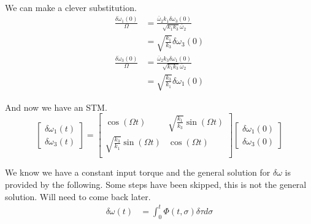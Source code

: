 \documentclass[]{article}
\begin{document}
We can make a clever substitution.
\begin{align}
	\frac{\delta \dot{\omega}_1 (0)}{\Omega} & = \frac{\bar{\omega}_2 k_1 \delta \omega_3(0)}{\sqrt{k_1 k_3} \bar{\omega}_2} \\
	& = \sqrt{\frac{k_1}{k_3}}\delta \omega_3(0) \\
	\frac{\delta \dot{\omega}_3 (0)}{\Omega} & = \frac{\bar{\omega}_2 k_3 \delta \omega_1(0)}{\sqrt{k_1 k_3} \bar{\omega}_2} \\
	& = \sqrt{\frac{k_3}{k_1}}\delta \omega_1(0)
\end{align}

And now we have an STM.
\begin{equation}
	\begin{bmatrix}
	\delta \omega_1 (t) \\
	\delta \omega_3 (t)
	\end{bmatrix} = \begin{bmatrix}
	\cos(\Omega t) & \sqrt{\frac{k_1}{k_3}} \sin(\Omega t) \\
	\sqrt{\frac{k_3}{k_1}} \sin(\Omega t) & \cos(\Omega t) \\
	\end{bmatrix} \begin{bmatrix}
	\delta \omega_1 (0) \\
	\delta \omega_3 (0)
	\end{bmatrix}
\end{equation}

We know we have a constant input torque and the general solution for $\delta \omega$ is provided by the following. Some steps have been skipped, this is not the general solution. Will need to come back later.
\begin{align}
	\delta \omega (t) & = \int_{0}^{t} \Phi(t,\sigma) \delta \tau d \sigma
\end{align}
\end{document}
